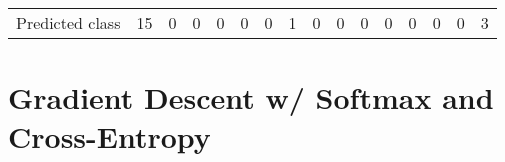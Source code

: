 \documentclass[12pt]{article}
\begin{document}
\begin{enumerate}
\begin{table}[H]
\begin{tabular}{@{}llclllllllllllll@{}}
\multirow{-14}{*}{\cellcolor[HTML]{34FF34}Predicted class} & \cellcolor[HTML]{34FF34}15 & 0                         & 0                         & 0                         & 0                         & 0                         & 1                         & 0                         & 0                         & 0                          & 0                          & 0                          & 0                          & 0                          & 3                          \\ \cmidrule(l){2-16} 
\end{tabular}
\end{table}

\end{enumerate}

\newpage

\section{Gradient Descent w/ Softmax and Cross-Entropy}
\end{document}

